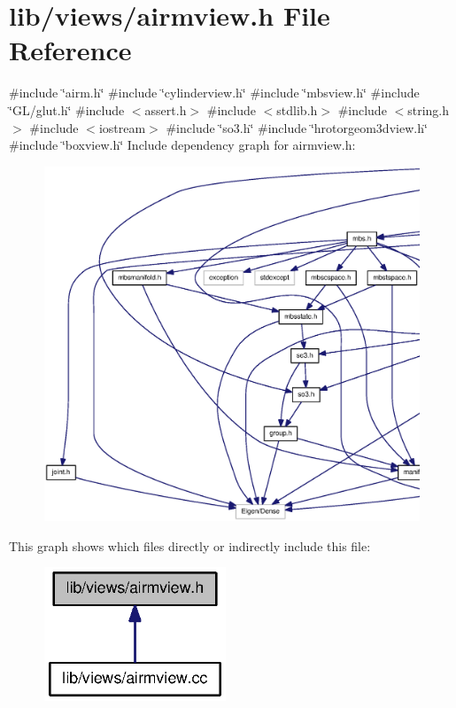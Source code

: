 \section{lib/views/airmview.h \-File \-Reference}
\label{airmview_8h}
{\ttfamily \#include \char`\"{}airm.\-h\char`\"{}}\*
{\ttfamily \#include \char`\"{}cylinderview.\-h\char`\"{}}\*
{\ttfamily \#include \char`\"{}mbsview.\-h\char`\"{}}\*
{\ttfamily \#include \char`\"{}\-G\-L/glut.\-h\char`\"{}}\*
{\ttfamily \#include $<$assert.\-h$>$}\*
{\ttfamily \#include $<$stdlib.\-h$>$}\*
{\ttfamily \#include $<$string.\-h$>$}\*
{\ttfamily \#include $<$iostream$>$}\*
{\ttfamily \#include \char`\"{}so3.\-h\char`\"{}}\*
{\ttfamily \#include \char`\"{}hrotorgeom3dview.\-h\char`\"{}}\*
{\ttfamily \#include \char`\"{}boxview.\-h\char`\"{}}\*
\-Include dependency graph for airmview.\-h\-:
\nopagebreak
\begin{figure}[H]
\begin{center}
\leavevmode
\includegraphics[width=350pt]{airmview_8h__incl}
\end{center}
\end{figure}
\-This graph shows which files directly or indirectly include this file\-:
\nopagebreak
\begin{figure}[H]
\begin{center}
\leavevmode
\includegraphics[width=154pt]{airmview_8h__dep__incl}
\end{center}
\end{figure}

